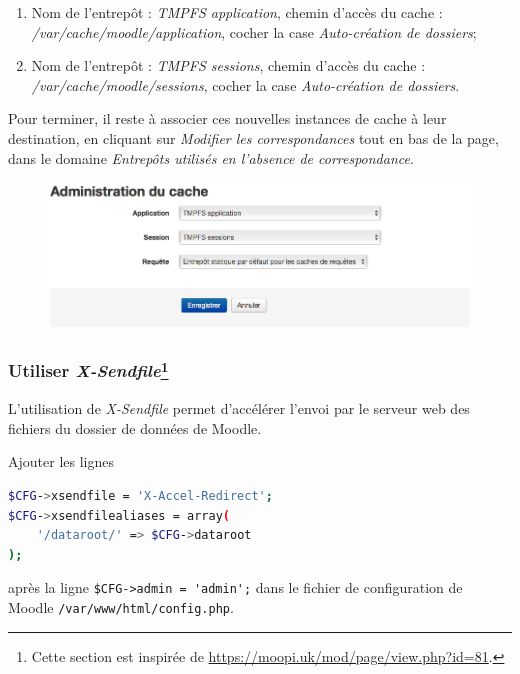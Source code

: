 \documentclass[11pt]{article}
\begin{document}
\begin{enumerate}
\item Nom de l'entrepôt : \emph{TMPFS application}, chemin d'accès du cache : \emph{/var/cache/moodle/application}, cocher la case \emph{Auto-création de dossiers};
\item Nom de l'entrepôt : \emph{TMPFS sessions}, chemin d'accès du cache : \emph{/var/cache/moodle/sessions}, cocher la case \emph{Auto-création de dossiers}.
\end{enumerate}

Pour terminer, il reste à associer ces nouvelles instances de cache à leur destination, en cliquant sur \emph{Modifier les correspondances} tout en bas de la page, dans le domaine \emph{Entrepôts utilisés en l'absence de correspondance}.

\begin{figure}[!ht]
\begin{minipage}[b]{\linewidth}
\centering
\includegraphics[width=\linewidth]{cache-association.png}
\end{minipage}
\end{figure}

\subsubsection[Utiliser \emph{X-Sendfile}]{Utiliser \emph{X-Sendfile}\footnote{Cette section est inspirée de \url{https://moopi.uk/mod/page/view.php?id=81}.}}

L'utilisation de \emph{X-Sendfile} permet d'accélérer l'envoi par le serveur web des fichiers du dossier de données de Moodle.

Ajouter les lignes
\begin{lstlisting}[language=bash]
$CFG->xsendfile = 'X-Accel-Redirect';
$CFG->xsendfilealiases = array(
    '/dataroot/' => $CFG->dataroot
);
\end{lstlisting}
après la ligne \lstinline{$CFG->admin = 'admin';} dans le fichier de configuration de Moodle \lstinline{/var/www/html/config.php}.
\end{document}
